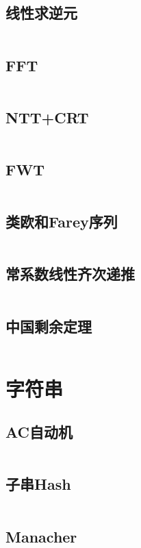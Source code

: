 \documentclass[UTF8]{ctexart}
\begin{document}
\subsection{线性求逆元}
\inputminted{cpp}{math/线性求逆元.cpp}

\subsection{FFT}
\inputminted{cpp}{math/FFT.cpp}

\subsection{NTT+CRT}
\inputminted{cpp}{math/NTT+CRT.cpp}

\subsection{FWT}
\inputminted{cpp}{math/FWT.cpp}

\subsection{类欧和Farey序列}
\inputminted{cpp}{math/类欧和Farey序列.cpp}

\subsection{常系数线性齐次递推}
\inputminted{cpp}{math/常系数线性齐次递推.cpp}

\subsection{中国剩余定理}
\inputminted{cpp}{math/中国剩余定理.cpp}

\section{字符串}

\subsection{AC自动机}
\inputminted{cpp}{string/AC自动机.cpp}

\subsection{子串Hash}
\inputminted{cpp}{string/Hash.cpp}

\subsection{Manacher}
\inputminted{cpp}{string/Manacher回文串.cpp}
\end{document}
